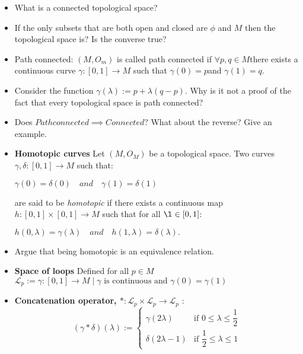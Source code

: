 \begin{itemize}
\item 
What is a connected topological space?

\item 
If the only subsets that are both open and closed are $ \phi $ and $ M $ then the topological space is? Is the converse true?


\item 

Path connected: 
$ (M,O_{m})$ is called path connected if $ \forall p,q \in M $there exists a continuous curve $ \gamma : [0,1] \rightarrow  M $ such that  $ \gamma(0) = p$and $ \gamma(1) = q $.

\item 
Consider the function $ \gamma(\lambda) := p+ \lambda(q-p) $. Why is it not a proof of the fact that every topological space is path connected?

\item 
Does $ Path connected \implies Connected $? What about the reverse? Give an example.

\item 
\textbf{Homotopic curves}
Let $(M,O_{M})$ be a topological space. Two curves $\gamma,\delta :[0,1]\to M$ such that:

$\gamma(0)=\delta(0) \quad and \quad \gamma(1)=\delta(1)$

are said to be \emph{homotopic} if there exists a continuous map $h : [0,1]\times[0,1]\to M$ such that for all $\l \in [0,1]$:

$h(0,\lambda) = \gamma(\lambda) \quad and \quad h(1,\lambda)=\delta(\lambda).$

\item 
Argue that being homotopic is an equivalence relation.

\item 
\textbf{Space of loops} Defined for all $ p \in M $\\

$\mathscr{L}_{p} := {\gamma:[0,1]\to M \mid \gamma \text{ is continuous and } \gamma(0) = \gamma(1) }$

\item 
\textbf{Concatenation operator, $ * : \mathscr{L}_{p} \times \mathscr{L}_{p} \to \mathscr{L}_{p}  $} :\\
\[
 (\gamma * \delta)(\lambda) :=
\begin{cases}
\gamma(2\lambda) & \text{if } 0\leq \lambda \leq \dfrac{1}{2}\\
\delta(2\lambda -1) & \text{if }\dfrac{1}{2} \leq \lambda \leq 1
\end{cases}
\]









\end{itemize}




